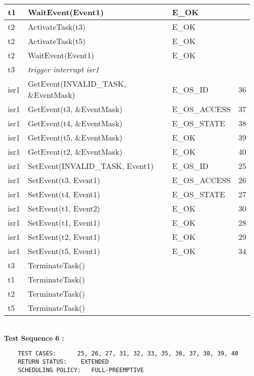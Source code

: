\documentclass[10pt]{article}
\newlength{\Li}\settowidth{\Li}{Running}
\newlength{\Lii}\setlength{\Lii}{7cm}
\newlength{\Liiii}\setlength{\Liiii}{0.9cm}
\newlength{\Liii}\setlength{\Liii}{\textwidth} \addtolength{\Liii}{-\Li} \addtolength{\Liii}{-\Lii} \addtolength{\Liii}{-\Liiii}
\begin{document}
	\begin{supertabular}{|p{\Li}|p{\Lii}|p{\Liii}|p{\Liiii}|} \hline 
	t1	& WaitEvent(Event1) 						& E\_OK	 			& \\ \hline 
	t2	& ActivateTask(t3)							& E\_OK				& \\ \hline 
	t2	& ActivateTask(t5)							& E\_OK				& \\ \hline 
	t2	& WaitEvent(Event1) 						& E\_OK	 			& \\ \hline 
	t3 	& \textit{trigger interrupt isr1}					&  					& \\ \hline
	isr1	& GetEvent(INVALID\_TASK, \&EventMask) 		& E\_OS\_ID			& 36 \\ \hline 
	isr1 	& GetEvent(t3, \&EventMask)					& E\_OS\_ACCESS 		& 37 \\ \hline 
	isr1	& GetEvent(t4, \&EventMask) 					& E\_OS\_STATE 		& 38 \\ \hline 
	isr1 	& GetEvent(t5, \&EventMask)					& E\_OK 				& 39 \\ \hline 
	isr1	& GetEvent(t2, \&EventMask) 					& E\_OK		 		& 40 \\ \hline 
	isr1	& SetEvent(INVALID\_TASK, Event1) 			& E\_OS\_ID	 		& 25 \\ \hline 
	isr1	& SetEvent(t3, Event1) 						& E\_OS\_ACCESS 		& 26 \\ \hline 
	isr1	& SetEvent(t4, Event1) 						& E\_OS\_STATE		& 27 \\ \hline 
	isr1	& SetEvent(t1, Event2) 						& E\_OK		 		& 30 \\ \hline 
	isr1	& SetEvent(t1, Event1) 						& E\_OK		 		& 28 \\ \hline 
	isr1	& SetEvent(t2, Event1) 						& E\_OK		 		& 29 \\ \hline 
	isr1	& SetEvent(t5, Event1) 						& E\_OK		 		& 34 \\ \hline 
	t3	& TerminateTask()							&					&  \\ \hline
	t1	& TerminateTask()							&					&  \\ \hline
	t2	& TerminateTask()							&					&  \\ \hline
	t5	& TerminateTask()							&					&  \\ \hline
	\end{supertabular} \\
	
	\textbf{Test Sequence 6 :}
	\begin{lstlisting}
	TEST CASES:		 25, 26, 27, 31, 32, 33, 35, 36, 37, 38, 39, 40
	RETURN STATUS:	  EXTENDED 
	SCHEDULING POLICY:   FULL-PREEMPTIVE
	\end{lstlisting}
	
\end{document}
